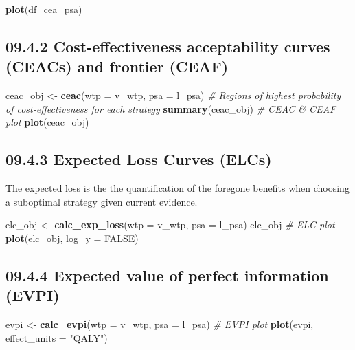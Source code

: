 \documentclass[]{article}
\newenvironment{Shaded}{\begin{snugshade}}{\end{snugshade}}
\newcommand{\KeywordTok}[1]{\textcolor[rgb]{0.13,0.29,0.53}{\textbf{#1}}}
\newcommand{\DataTypeTok}[1]{\textcolor[rgb]{0.13,0.29,0.53}{#1}}
\newcommand{\StringTok}[1]{\textcolor[rgb]{0.31,0.60,0.02}{#1}}
\newcommand{\CommentTok}[1]{\textcolor[rgb]{0.56,0.35,0.01}{\textit{#1}}}
\newcommand{\OtherTok}[1]{\textcolor[rgb]{0.56,0.35,0.01}{#1}}
\newcommand{\NormalTok}[1]{#1}
\begin{document}
\begin{Shaded}
\begin{Highlighting}[]
\KeywordTok{plot}\NormalTok{(df_cea_psa)}
\end{Highlighting}
\end{Shaded}

\subsection{09.4.2 Cost-effectiveness acceptability curves (CEACs) and
frontier
(CEAF)}\label{cost-effectiveness-acceptability-curves-ceacs-and-frontier-ceaf}

\begin{Shaded}
\begin{Highlighting}[]
\NormalTok{ceac_obj <-}\StringTok{ }\KeywordTok{ceac}\NormalTok{(}\DataTypeTok{wtp =}\NormalTok{ v_wtp, }\DataTypeTok{psa =}\NormalTok{ l_psa)}
\CommentTok{# Regions of highest probability of cost-effectiveness for each strategy}
\KeywordTok{summary}\NormalTok{(ceac_obj)}
\CommentTok{# CEAC & CEAF plot}
\KeywordTok{plot}\NormalTok{(ceac_obj)}
\end{Highlighting}
\end{Shaded}

\subsection{09.4.3 Expected Loss Curves
(ELCs)}\label{expected-loss-curves-elcs}

The expected loss is the the quantification of the foregone benefits
when choosing a suboptimal strategy given current evidence.

\begin{Shaded}
\begin{Highlighting}[]
\NormalTok{elc_obj <-}\StringTok{ }\KeywordTok{calc_exp_loss}\NormalTok{(}\DataTypeTok{wtp =}\NormalTok{ v_wtp, }\DataTypeTok{psa =}\NormalTok{ l_psa)}
\NormalTok{elc_obj}
\CommentTok{# ELC plot}
\KeywordTok{plot}\NormalTok{(elc_obj, }\DataTypeTok{log_y =} \OtherTok{FALSE}\NormalTok{)}
\end{Highlighting}
\end{Shaded}

\subsection{09.4.4 Expected value of perfect information
(EVPI)}\label{expected-value-of-perfect-information-evpi}

\begin{Shaded}
\begin{Highlighting}[]
\NormalTok{evpi <-}\StringTok{ }\KeywordTok{calc_evpi}\NormalTok{(}\DataTypeTok{wtp =}\NormalTok{ v_wtp, }\DataTypeTok{psa =}\NormalTok{ l_psa)}
\CommentTok{# EVPI plot}
\KeywordTok{plot}\NormalTok{(evpi, }\DataTypeTok{effect_units =} \StringTok{"QALY"}\NormalTok{)}
\end{Highlighting}
\end{Shaded}
\end{document}
